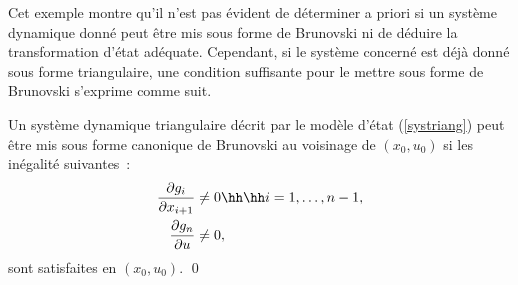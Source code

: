 Cet exemple montre qu'il n'est pas évident de déterminer a priori si un système dynamique donné peut être mis sous forme de Brunovski ni de déduire la transformation d'état adéquate. Cependant, si le système concerné est déjà donné sous forme triangulaire, une condition suffisante pour le mettre sous forme de Brunovski s'exprime comme suit.
\begin{lemme}{\blanc} \label{lemmeici}

Un système dynamique triangulaire décrit par le modèle d'état (\ref{systriang}) peut être mis sous forme canonique de Brunovski au voisinage de $(x_0,u_0)$ si les inégalité suivantes~:
\begin{equation*} \begin{split}
\frac{\partial g_i}{\partial x_{i+1}} &\neq 0 \hh \hh i=1, \ldots, n-1, \\
\frac{\partial g_n}{\partial u} &\neq 0,
\end{split} \end{equation*}
sont satisfaites en $(x_0,u_0)$.
\qed
\end{lemme}
\vv

